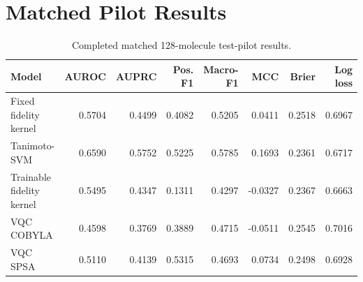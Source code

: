 \section{Matched Pilot Results}
\begin{table}[H]
\centering
\caption{Completed matched 128-molecule test-pilot results.}
\label{tab:matched_results}
\begin{tabular}{lrrrrrrr}
\toprule
Model & AUROC & AUPRC & Pos. F1 & Macro-F1 & MCC & Brier & Log loss \\
\midrule
Fixed fidelity kernel & 0.5704 & 0.4499 & 0.4082 & 0.5205 & 0.0411 & 0.2518 & 0.6967 \\
Tanimoto-SVM & 0.6590 & 0.5752 & 0.5225 & 0.5785 & 0.1693 & 0.2361 & 0.6717 \\
Trainable fidelity kernel & 0.5495 & 0.4347 & 0.1311 & 0.4297 & -0.0327 & 0.2367 & 0.6663 \\
VQC COBYLA & 0.4598 & 0.3769 & 0.3889 & 0.4715 & -0.0511 & 0.2545 & 0.7016 \\
VQC SPSA & 0.5110 & 0.4139 & 0.5315 & 0.4693 & 0.0734 & 0.2498 & 0.6928 \\
\bottomrule
\end{tabular}
\end{table}
